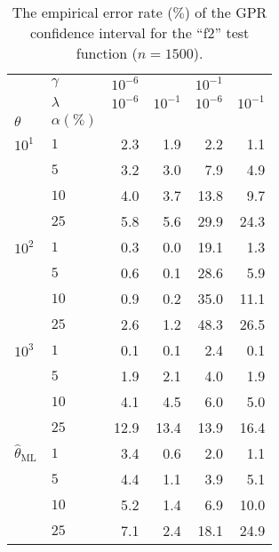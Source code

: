 \documentclass[10pt, conference, compsocconf]{IEEEtran}
\begin{document}
\begin{table}
  \centering
  \caption{The empirical error rate ($\%$) of the GPR confidence interval for the
  ``f2'' test function ($n=1500$).}
  \label{tab:nongaussian_f2_2d_cov_gpr}
  \begin{tabular}{ll||rrrr}
  \toprule
       & $\gamma$ & $10^{-6}$ &          & $10^{-1}$ &          \\\cline{2-2}
       & $\lambda$ & $10^{-6}$ & $10^{-1}$ & $10^{-6}$ & $10^{-1}$ \\\cline{2-2}
  $\theta$ & $\alpha(\%)$ &          &          &          &          \\
  \midrule
   $10^1$ & $1$ &      2.3 &      1.9 &      2.2 &      1.1 \\
        & $5$ &      3.2 &      3.0 &      7.9 &      4.9 \\
        & $10$ &      4.0 &      3.7 &     13.8 &      9.7 \\
        & $25$ &      5.8 &      5.6 &     29.9 &     24.3 \\
  \midrule
   $10^2$ & $1$ &      0.3 &      0.0 &     19.1 &      1.3 \\
        & $5$ &      0.6 &      0.1 &     28.6 &      5.9 \\
        & $10$ &      0.9 &      0.2 &     35.0 &     11.1 \\
        & $25$ &      2.6 &      1.2 &     48.3 &     26.5 \\
  \midrule
   $10^3$ & $1$ &      0.1 &      0.1 &      2.4 &      0.1 \\
        & $5$ &      1.9 &      2.1 &      4.0 &      1.9 \\
        & $10$ &      4.1 &      4.5 &      6.0 &      5.0 \\
        & $25$ &     12.9 &     13.4 &     13.9 &     16.4 \\
  \midrule
   $\hat{\theta}_\text{ML}$ & $1$ &      3.4 &      0.6 &      2.0 &      1.1 \\
        & $5$ &      4.4 &      1.1 &      3.9 &      5.1 \\
        & $10$ &      5.2 &      1.4 &      6.9 &     10.0 \\
        & $25$ &      7.1 &      2.4 &     18.1 &     24.9 \\
  \bottomrule
  \end{tabular}
\end{table}
\end{document}
